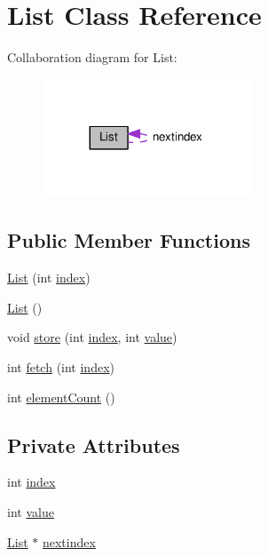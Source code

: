 \hypertarget{classList}{}\section{List Class Reference}
\label{classList}


Collaboration diagram for List\+:
\nopagebreak
\begin{figure}[H]
\begin{center}
\leavevmode
\includegraphics[width=176pt]{classList__coll__graph}
\end{center}
\end{figure}
\subsection*{Public Member Functions}
\begin{DoxyCompactItemize}
\item 
\hyperlink{classList_abff7b193d6391a5c5913be5fdc2c768f}{List} (int \hyperlink{classList_abfa64c9cd203a37cf5396b56777c8fc9}{index})
\item 
\hyperlink{classList_a64d878a92d11f7c63c70cbe4e7dd4176}{List} ()
\item 
void \hyperlink{classList_ae769414aa9a0fc3374df51f3b787c5e9}{store} (int \hyperlink{classList_abfa64c9cd203a37cf5396b56777c8fc9}{index}, int \hyperlink{classList_a481a3c1548a0e45daad6f2721f88c999}{value})
\item 
int \hyperlink{classList_a7c24ac131f6731a4909424cde96064d0}{fetch} (int \hyperlink{classList_abfa64c9cd203a37cf5396b56777c8fc9}{index})
\item 
int \hyperlink{classList_a5ee9aff9e61a566f7ce0ac9c6153cda5}{element\+Count} ()
\end{DoxyCompactItemize}
\subsection*{Private Attributes}
\begin{DoxyCompactItemize}
\item 
int \hyperlink{classList_abfa64c9cd203a37cf5396b56777c8fc9}{index}
\item 
int \hyperlink{classList_a481a3c1548a0e45daad6f2721f88c999}{value}
\item 
\hyperlink{classList}{List} $\ast$ \hyperlink{classList_a09744c906650fff0fc8ca5130fd717b1}{nextindex}
\end{DoxyCompactItemize}



